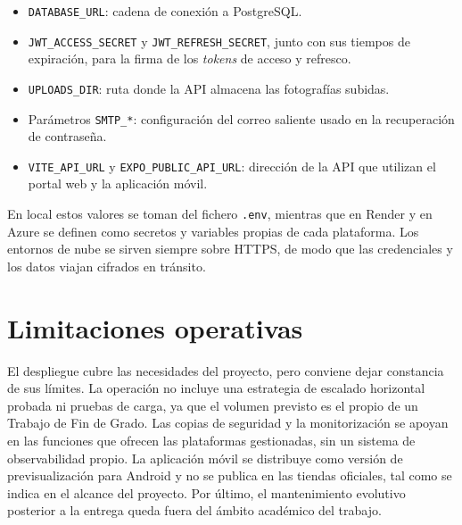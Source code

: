 \begin{itemize}
  \item \texttt{DATABASE\_URL}: cadena de conexión a PostgreSQL.
  \item \texttt{JWT\_ACCESS\_SECRET} y \texttt{JWT\_REFRESH\_SECRET}, junto con sus
    tiempos de expiración, para la firma de los \textit{tokens} de acceso y refresco.
  \item \texttt{UPLOADS\_DIR}: ruta donde la API almacena las fotografías subidas.
  \item Parámetros \texttt{SMTP\_*}: configuración del correo saliente usado en la
    recuperación de contraseña.
  \item \texttt{VITE\_API\_URL} y \texttt{EXPO\_PUBLIC\_API\_URL}: dirección de la API
    que utilizan el portal web y la aplicación móvil.
\end{itemize}

En local estos valores se toman del fichero \texttt{.env}, mientras que en Render y en
Azure se definen como secretos y variables propias de cada plataforma. Los entornos de
nube se sirven siempre sobre HTTPS, de modo que las credenciales y los datos viajan
cifrados en tránsito.

\section{Limitaciones operativas}

El despliegue cubre las necesidades del proyecto, pero conviene dejar constancia de sus
límites. La operación no incluye una estrategia de escalado horizontal probada ni
pruebas de carga, ya que el volumen previsto es el propio de un Trabajo de Fin de Grado.
Las copias de seguridad y la monitorización se apoyan en las funciones que ofrecen las
plataformas gestionadas, sin un sistema de observabilidad propio. La aplicación móvil se
distribuye como versión de previsualización para Android y no se publica en las tiendas
oficiales, tal como se indica en el alcance del proyecto. Por último, el mantenimiento
evolutivo posterior a la entrega queda fuera del ámbito académico del trabajo.
